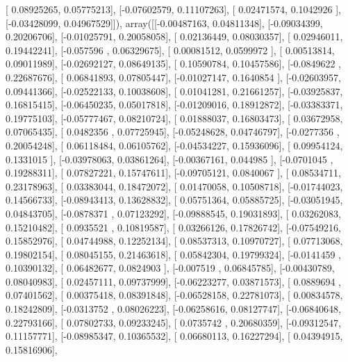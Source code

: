 \documentclass{article}
\begin{document}
       [ 0.08925265,  0.05775213],
       [-0.07602579,  0.11107263],
       [ 0.02471574,  0.1042926 ],
       [-0.03428099,  0.04967529]]), array([[-0.00487163,  0.04811348],
       [-0.09034399,  0.20206706],
       [-0.01025791,  0.20058058],
       [ 0.02136449,  0.08030357],
       [ 0.02946011,  0.19442241],
       [-0.057596  ,  0.06329675],
       [ 0.00081512,  0.0599972 ],
       [ 0.00513814,  0.09011989],
       [-0.02692127,  0.08649135],
       [ 0.10590784,  0.10457586],
       [-0.0849622 ,  0.22687676],
       [ 0.06841893,  0.07805447],
       [-0.01027147,  0.1640854 ],
       [-0.02603957,  0.09441366],
       [-0.02522133,  0.10038608],
       [ 0.01041281,  0.21661257],
       [-0.03925837,  0.16815415],
       [-0.06450235,  0.05017818],
       [-0.01209016,  0.18912872],
       [-0.03383371,  0.19775103],
       [-0.05777467,  0.08210724],
       [ 0.01888037,  0.16803473],
       [ 0.03672958,  0.07065435],
       [ 0.0482356 ,  0.07725945],
       [-0.05248628,  0.04746797],
       [-0.0277356 ,  0.20054248],
       [ 0.06118484,  0.06105762],
       [-0.04534227,  0.15936096],
       [ 0.09954124,  0.1331015 ],
       [-0.03978063,  0.03861264],
       [-0.00367161,  0.044985  ],
       [-0.0701045 ,  0.19288311],
       [ 0.07827221,  0.15747611],
       [-0.09705121,  0.0840067 ],
       [ 0.08534711,  0.23178963],
       [ 0.03383044,  0.18472072],
       [ 0.01470058,  0.10508718],
       [-0.01744023,  0.14566733],
       [-0.08943413,  0.13628832],
       [ 0.05751364,  0.05885725],
       [-0.03051945,  0.04843705],
       [-0.0878371 ,  0.07123292],
       [-0.09888545,  0.19031893],
       [ 0.03262083,  0.15210482],
       [ 0.0935521 ,  0.10819587],
       [ 0.03266126,  0.17826742],
       [-0.07549216,  0.15852976],
       [ 0.04744988,  0.12252134],
       [ 0.08537313,  0.10970727],
       [ 0.07713068,  0.19802154],
       [ 0.08045155,  0.21463618],
       [ 0.05842304,  0.19799324],
       [-0.0141459 ,  0.10390132],
       [ 0.06482677,  0.0824903 ],
       [-0.007519  ,  0.06845785],
       [-0.00430789,  0.08040983],
       [ 0.02457111,  0.09737999],
       [-0.06223277,  0.03871573],
       [ 0.0889694 ,  0.07401562],
       [ 0.00375418,  0.08391848],
       [-0.06528158,  0.22781073],
       [ 0.00834578,  0.18242809],
       [-0.0313752 ,  0.08026223],
       [-0.06258616,  0.08127747],
       [-0.06840648,  0.22793166],
       [ 0.07802733,  0.09233245],
       [ 0.0735742 ,  0.20680359],
       [-0.09312547,  0.11157771],
       [-0.08985347,  0.10365532],
       [ 0.06680113,  0.16227294],
       [ 0.04394915,  0.15816906],
\end{document}
